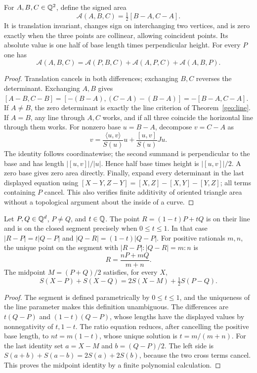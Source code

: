 \begin{theorem}
\label{geo:area}
For $A,B,C\in\mathbb Q^2$, define the signed area
\[
 \mathcal A(A,B,C)=\tfrac12[B-A,C-A].
\]
It is translation invariant, changes sign on interchanging two vertices,
and is zero exactly when the three points are collinear, allowing coincident
points. Its absolute value is one half of base length times perpendicular
height. For every $P$ one has
\[
 \mathcal A(A,B,C)=\mathcal A(P,B,C)+\mathcal A(A,P,C)+\mathcal A(A,B,P).
\]
\end{theorem}
\begin{proof}
Translation cancels in both differences; exchanging $B,C$ reverses the
determinant. Exchanging $A,B$ gives
$[A-B,C-B]=[-(B-A),(C-A)-(B-A)]=-[B-A,C-A]$.
If $A\ne B$, the zero determinant is exactly the line criterion of
Theorem~\ref{geo:line}. If $A=B$, any line through $A,C$ works, and if all
three coincide the horizontal line through them works.
For nonzero base $u=B-A$, decompose $v=C-A$ as
\[
 v=\frac{\langle u,v\rangle}{S(u)}u+
       \frac{[u,v]}{S(u)}Ju.
\]
The identity follows coordinatewise; the second summand is perpendicular
to the base and has length $|[u,v]|/|u|$. Hence half base times height is
$|[u,v]|/2$. A zero base gives zero area directly.
Finally, expand every determinant in the last displayed equation using
$[X-Y,Z-Y]=[X,Z]-[X,Y]-[Y,Z]$; all terms containing $P$ cancel.
This also verifies finite additivity of oriented triangle area without a
topological argument about the inside of a curve.
\end{proof}

\begin{theorem}
\label{geo:section}
Let $P,Q\in\mathbb Q^d$, $P\ne Q$, and $t\in\mathbb Q$. The point
$R=(1-t)P+tQ$ is on their line and is on the closed segment precisely when
$0\le t\le1$. In that case
$|R-P|=t|Q-P|$ and $|Q-R|=(1-t)|Q-P|$.
For positive rationals $m,n$, the unique point on the segment with
$|R-P|:|Q-R|=m:n$ is
\[
 R=\frac{nP+mQ}{m+n}.
\]
The midpoint $M=(P+Q)/2$ satisfies, for every $X$,
\[
 S(X-P)+S(X-Q)=2S(X-M)+\tfrac12 S(P-Q).
\]
\end{theorem}
\begin{proof}
The segment is defined parametrically by $0\le t\le1$, and the uniqueness
of the line parameter makes this definition unambiguous. The differences
are $t(Q-P)$ and $(1-t)(Q-P)$, whose lengths have the displayed values by
nonnegativity of $t,1-t$. The ratio equation reduces, after cancelling the
positive base length, to $nt=m(1-t)$, whose unique solution is
$t=m/(m+n)$. For the last identity set $a=X-M$ and $b=(Q-P)/2$.
The left side is $S(a+b)+S(a-b)=2S(a)+2S(b)$, because the two cross terms
cancel. This proves the midpoint identity by a finite polynomial calculation.
\end{proof}

